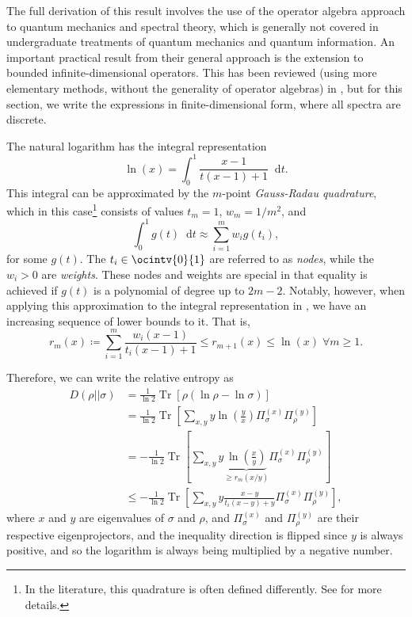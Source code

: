 \documentclass[10pt, a4paper]{article}
\numberwithin{equation}{section} %
\theoremstyle{definition}
\theoremstyle{plain}
\newcommand{\dif}{\mathop{}\!\mathrm{d}} %
\newcommand{\?}{\mathrel{?}} %
\newcommand{\Tr}[2][]{\mathop{\mathrm{Tr}#1}\left[ #2 \right]} %
\begin{document}
    The full derivation of this result involves the use of the operator algebra approach to quantum mechanics and spectral theory, which is generally not covered in undergraduate treatments of quantum mechanics and quantum information. An important practical result from their general approach is the extension to bounded infinite-dimensional operators. This has been reviewed (using more elementary methods, without the generality of operator algebras) in , but for this section, we write the expressions in finite-dimensional form, where all spectra are discrete.

    The natural logarithm has the integral representation
    \begin{equation}
      \ln\left(x\right) = \int_{0}^{1} \frac{x-1}{t(x-1) + 1} \dif{t}.\label{eqn:integral_log}
    \end{equation}
    This integral can be approximated by the \(m\)-point \emph{Gauss-Radau quadrature}, which in this case\footnote{In the literature, this quadrature is often defined differently. See  for more details.} consists of values \(t_m = 1\), \(w_m = 1/m^2\), and
    \begin{equation}
      \int_{0}^{1} g(t) \dif{t} \approx \sum_{i=1}^m w_i g(t_i),
    \end{equation}
    for some \(g(t)\). The \(t_i \in \ocintv{0}{1}\) are referred to as \emph{nodes}, while the \(w_i > 0\) are \emph{weights}. These nodes and weights are special in that equality is achieved if \(g(t)\) is a polynomial of degree up to \(2m-2\). Notably, however, when applying this approximation to the integral representation in , we have an increasing sequence of lower bounds to it. That is,
    \begin{equation}
      r_m(x) \coloneqq \sum_{i=1}^m \frac{w_i(x-1)}{t_i(x-1) + 1} \leq r_{m+1}(x) \leq \ln\left(x\right) \;\forall m \geq 1.
    \end{equation}

    Therefore, we can write the relative entropy as
    \begin{align}
      D(\rho||\sigma) &= \frac{1}{\ln 2} \Tr{\rho \left(\ln\rho - \ln\sigma\right) } \\
                      &= \frac{1}{\ln 2} \Tr{ \sum_{x,y} y \ln\left(\frac{y}{x}\right) \Pi^{(x)}_{\sigma} \Pi^{(y)}_{\rho}  } \label{eqn:finitedim_relent} \\ 
                      &= -\frac{1}{\ln 2} \Tr{ \sum_{x,y} y \underbrace{\ln\left(\frac{x}{y}\right)}_{\geq r_m(x/y)} \Pi^{(x)}_{\sigma} \Pi^{(y)}_{\rho} } \\
                      &\leq -\frac{1}{\ln 2} \Tr{ \sum_{x,y} y \frac{x-y}{t_i(x-y)+y} \Pi^{(x)}_{\sigma} \Pi^{(y)}_{\rho} },
    \end{align}
    where \(x\) and \(y\) are eigenvalues of \(\sigma\) and \(\rho\), and \(\Pi^{(x)}_{\sigma}\) and \(\Pi^{(y)}_{\rho}\) are their respective eigenprojectors, and the inequality direction is flipped since \(y\) is always positive, and so the logarithm is always being multiplied by a negative number.
\end{document}
